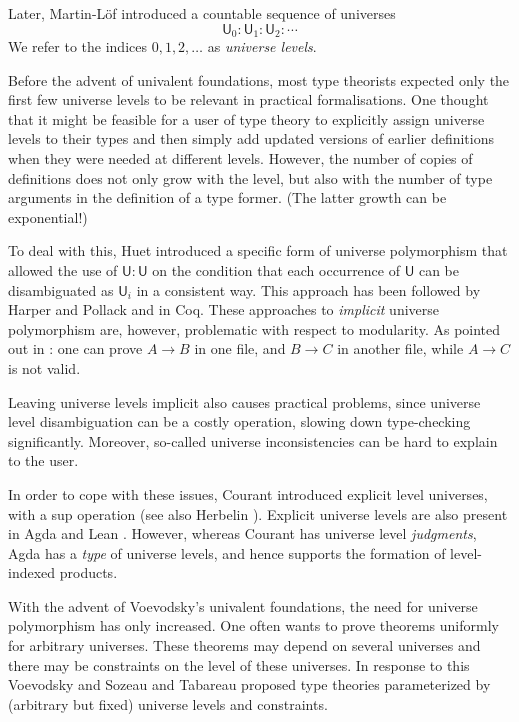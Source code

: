 \documentclass[11pt,a4paper]{article}
\theoremstyle{definition}
\newcommand{\UU}{\mathsf{U}}
\begin{document}
Later, Martin-L\"of \cite{martinlof:predicative} introduced a countable sequence of universes
$$
\UU_0 : \UU_1 : \UU_2 : \cdots
$$
We refer to the indices $0, 1, 2, \ldots$ as {\em universe levels}.

Before the advent of univalent foundations, most type theorists expected
only the first few universe levels to be relevant in practical formalisations.
One thought that it might be feasible for a user of
type theory to explicitly assign universe levels to their types and
then simply add updated versions of earlier
definitions when they were needed at different levels.
However, the number of copies of definitions does not only grow with the level,
but also with the number of type arguments in the definition of a type former.
(The latter growth can be exponential!)

To deal with this, Huet \cite{Huet87} introduced a specific form of
universe polymorphism that allowed the use of $\UU:\UU$
on the condition that each occurrence of $\UU$ can be disambiguated
as $\UU_i$ in a consistent way.
This approach has been followed by Harper and Pollack \cite{HarperP91} and
in Coq.
These  approaches to \emph{implicit} universe polymorphism are, however,
problematic with respect to modularity. As pointed out in \cite{Courant02,Simpson04}:
one can prove $A\rightarrow B$ in one file, and $B\rightarrow C$ in
another file, while $A\rightarrow C$ is not valid.

Leaving universe levels implicit also causes practical problems,
since universe level disambiguation can be a costly operation,
slowing down type-checking significantly.
Moreover, so-called universe inconsistencies can be hard to explain to the user.

In order to cope with these issues, Courant \cite{Courant02}
introduced explicit level universes,
with a sup operation (see also Herbelin \cite{herbelin05}).
Explicit universe levels are also present in Agda \cite{agda-manual} and
Lean \cite{moura:lean,Carneiro19}.
However, whereas Courant has
universe level \emph{judgments}, Agda has a \emph{type} of
universe levels, and hence supports the formation of level-indexed products.
%

With the advent of Voevodsky's univalent foundations,
the need for universe polymorphism has only increased.
One often wants to prove theorems uniformly for arbitrary universes. These theorems may depend on several universes and there may be constraints on the level of these universes.
In response to this Voevodsky  \cite{VV} and Sozeau and Tabareau \cite{SozeauTabareau:coq} proposed type theories parameterized by
(arbitrary but fixed) universe levels and constraints.
\end{document}
